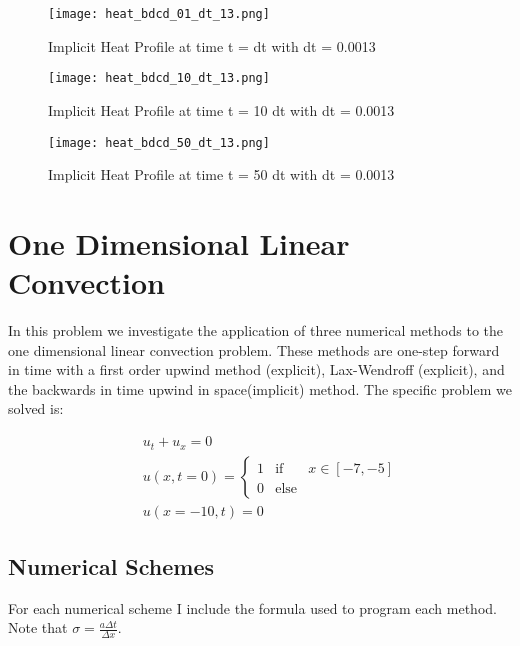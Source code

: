 \documentclass[a4paper,12pt,titlepage]{article}
\newcommand{\scale}{0.5}
\begin{document}
\begin{figure}[H]
  \begin{center}
    \texttt{[image: heat\_bdcd\_01\_dt\_13.png]}
    \caption{Implicit Heat Profile at time t = dt with dt = 0.0013}
  \end{center}
\end{figure}

\begin{figure}[H]
  \begin{center}
    \texttt{[image: heat\_bdcd\_10\_dt\_13.png]}
    \caption{Implicit Heat Profile at time t = 10 dt with dt = 0.0013}
  \end{center}
\end{figure}

\begin{figure}[H]
  \begin{center}
    \texttt{[image: heat\_bdcd\_50\_dt\_13.png]}
    \caption{Implicit Heat Profile at time t = 50 dt with dt = 0.0013}
  \end{center}
\end{figure}



\section{One Dimensional Linear Convection}

In this problem we investigate the application of three numerical methods to the one dimensional linear convection problem.  These methods are one-step forward in time with a first order upwind method (explicit), Lax-Wendroff (explicit), and the backwards in time upwind in space(implicit) method.  The specific problem we solved is:

\begin{eqnarray}
&& u_t + u_x = 0\nonumber \\
&& u(x,t=0) = \left\{\begin{array}{lll}1 & \mbox{if} & x \in [-7,-5]\\ 0 & \mbox{else} &  \end{array} \right.\nonumber \\
&& u(x = -10,t) = 0
\end{eqnarray}

\subsection{Numerical Schemes}
For each numerical scheme I include the formula used to program each method.  Note that $\sigma = \frac{a \Delta t}{\Delta x}$.
\end{document}

